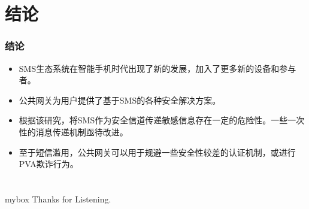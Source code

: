 \documentclass[10pt,aspectratio=43,mathserif]{beamer}
\begin{document}
\begin{frame}
\begin{columns}
            \end{columns}

		\end{frame}

\section[结论]{结论}


		\begin{frame}
		  \frametitle{\textbf{结论}}
		
		  \begin{itemize}
		    \item SMS生态系统在智能手机时代出现了新的发展，加入了更多新的设备和参与者。
		    \item 公共网关为用户提供了基于SMS的各种安全解决方案。
            \item 根据该研究，将SMS作为安全信道传递敏感信息存在一定的危险性。一些一次性的消息传递机制亟待改进。
            \item 至于短信滥用，公共网关可以用于规避一些安全性较差的认证机制，或进行PVA欺诈行为。
		  \end{itemize}
		\end{frame}


\section*{}
        \begin{frame}

            \begin{center}
                \begin{minipage}{1\textwidth}
                    \begin{beamercolorbox}[wd=0.70\textwidth, rounded=true, shadow=true]{mybox}
                    \LARGE \centering Thanks for Listening.
                    \end{beamercolorbox}
                \end{minipage}
            \end{center}

        \end{frame}
\end{document}
